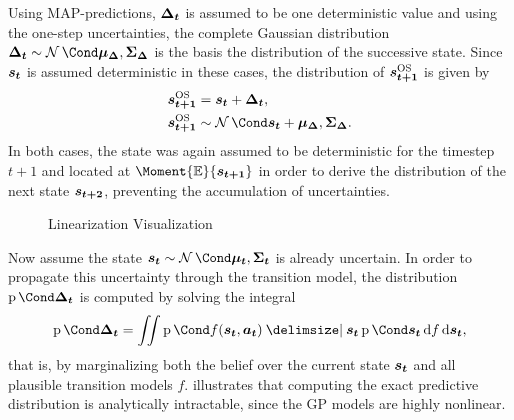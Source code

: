 Using MAP-predictions, $\bm{\Delta_t}$ is assumed to be one deterministic value and using the one-step uncertainties, the complete Gaussian distribution $\rv{\Delta_t} \sim \Gaussian{\mat{\mu_\Delta}, \mat{\Sigma_\Delta}}$ is the basis the distribution of the successive state.
Since $\bm{s_t}$ is assumed deterministic in these cases, the distribution of $\bm{s_{t+1}}^{\text{OS}}$ is given by
\begin{align}
    \os{\rv{s_{t+1}}} &= \mat{s_t} + \rv{\Delta_t}, \\
    \os{\rv{s_{t+1}}} &\sim \Gaussian{\mat{s_t} + \mat{\mu_\Delta}, \mat{\Sigma_\Delta}}.
\end{align}
In both cases, the state was again assumed to be deterministic for the timestep $t+1$ and located at $\Moment{\E}{\rv{s_{t+1}}}$ in order to derive the distribution of the next state $\bm{s_{t+2}}$, preventing the accumulation of uncertainties.

\begin{figure}[t]
    \centering
    \caption{Linearization Visualization}
    \label{fig:linearization}
\end{figure}
Now assume the state $\rv{s_t} \sim \Gaussian{\mat{\mu_t}, \mat{\Sigma_t}}$ is already uncertain.
In order to propagate this uncertainty through the transition model, the distribution $\Prob{\rv{\Delta_t}}$ is computed by solving the integral
\begin{align}
    \Prob{\rv{\Delta_t}} = \iint \Prob{f(\rv{s_t}, \mat{a_t}) \given \rv{s_t}} \Prob{\rv{s_t}} \diff f \diff \rv{s_t},
\end{align}
that is, by marginalizing both the belief over the current state $\bm{s_t}$ and all plausible transition models $f$.
 illustrates that computing the exact predictive distribution is analytically intractable, since the GP models are highly nonlinear.

